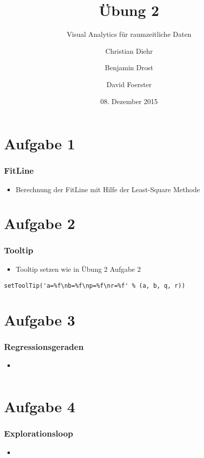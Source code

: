 \documentclass{beamer}
\title{Übung 2}
\subtitle{Visual Analytics für raumzeitliche Daten}
\author{Christian Diehr \and Benjamin Drost \and David Foerster}
\institute{Institut für Informatik\\Humboldt-Universität zu Berlin}
\date{08. Dezember 2015}
\begin{document}
    \begin{frame}
        \titlepage
    \end{frame}
    \logo %

    \section{Aufgabe 1}
    \begin{frame}[containsverbatim]
	    \frametitle{FitLine}
			\begin{itemize}
			\item Berechnung der FitLine mit Hilfe der Least-Square Methode
			\end{itemize}
    \end{frame}

    \section{Aufgabe 2}
    \begin{frame}[containsverbatim]
    	\frametitle{Tooltip}
    	\begin{itemize}
    		\setlength\itemsep{1em}
    		\item Tooltip setzen wie in Übung 2 Aufgabe 2
    	\end{itemize}
    	\begin{lstlisting}
setToolTip('a=%f\nb=%f\np=%f\nr=%f' % (a, b, q, r))
    	\end{lstlisting}
    \end{frame}

    
    \section{Aufgabe 3}
    \begin{frame}[containsverbatim]
    	\frametitle{Regressionsgeraden}
    	\begin{itemize}
    		\setlength\itemsep{1em}
    		\item 
    	\end{itemize}
    	\begin{lstlisting}

			\end{lstlisting}
    \end{frame}


    \section{Aufgabe 4}
    \begin{frame}[containsverbatim]
    	\frametitle{Explorationsloop}
    	\begin{itemize}
    		\item 
    	\end{itemize}
    \end{frame}
\end{document}
